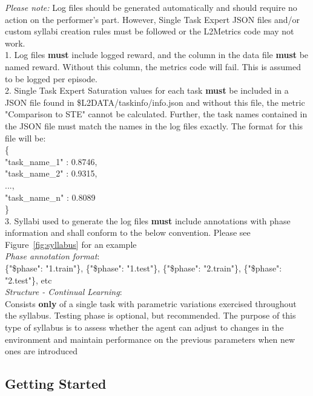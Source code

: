 \textit{Please note:} Log files should be generated automatically and should require no action on the performer's part. However, Single Task Expert JSON files and/or custom syllabi creation rules must be followed or the L2Metrics code may not work.\\[0.1in]


1. Log files \textbf{must} include logged reward, and the column in the data file \textbf{must} be named reward. Without this column, the metrics code will fail. This is assumed to be logged per episode. \\[0.1in]

2. Single Task Expert Saturation values for each task \textbf{must} be included in a JSON file found in \$L2DATA/taskinfo/info.json and without this file, the metric "Comparison to STE" cannot be calculated. Further, the task names contained in the JSON file must match the names in the log files exactly. The format for this file will be: \\[0.1in]

    \{\\
    "task\_name\_1" : 0.8746,\\
    "task\_name\_2" : 0.9315,\\
    ...,\\
    "task\_name\_n" : 0.8089\\
    \}\\[0.1in]

3. Syllabi used to generate the log files \textbf{must} include annotations with phase information and shall conform to the below convention. Please see Figure~\ref{fig:syllabus} for an example\\[0.1in]

\textit{Phase annotation format}:\\[0.1in]
    \{"\$phase":  "1.train"\}, \{"\$phase":  "1.test"\}, \{"\$phase":  "2.train"\}, \{"\$phase":  "2.test"\}, etc\\[0.1in]

\textit{Structure - Continual Learning}:\\[0.1in]

Consists \textbf{only} of a single task with parametric variations exercised throughout the syllabus. Testing phase is optional, but recommended. The purpose of this type of syllabus is to assess whether the agent can adjust to changes in the environment and maintain performance on the previous parameters when new ones are introduced


\subsection*{Getting Started}

